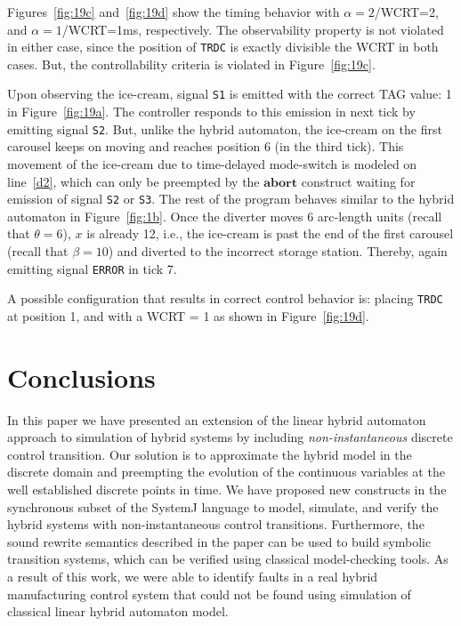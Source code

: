 \documentclass[10pt,journal,cspaper,compsoc]{IEEEtran}
\begin{document}
Figures~\ref{fig:19c} and~\ref{fig:19d} show the timing behavior with
$\alpha = 2$/WCRT=2, and $\alpha=1$/WCRT=1ms, respectively. The
observability property is not violated in either case, since the
position of \texttt{TRDC} is exactly divisible the WCRT in both
cases. But, the controllability criteria is violated in
Figure~\ref{fig:19c}.

Upon observing the ice-cream, signal \texttt{S1} is emitted with the
correct TAG value: 1 in Figure~\ref{fig:19a}. The controller responds to
this emission in next tick by emitting signal \texttt{S2}. But, unlike
the hybrid automaton, the ice-cream on the first carousel keeps on
moving and reaches position 6 (in the third tick). This movement of the
ice-cream due to time-delayed mode-switch is modeled on line~\ref{d2},
which can only be preempted by the $\mathbf{abort}$ construct waiting
for emission of signal \texttt{S2} or \texttt{S3}. The rest of the
program behaves similar to the hybrid automaton in
Figure~\ref{fig:1b}. Once the diverter moves 6 arc-length units (recall
that $\theta = 6$), $x$ is already 12, i.e., the ice-cream is past the
end of the first carousel (recall that $\beta=10$) and diverted to the
incorrect storage station. Thereby, again emitting signal \texttt{ERROR}
in tick 7.

A possible configuration that results in correct control behavior is:
placing \texttt{TRDC} at position 1, and with a WCRT = 1 as shown in
Figure~\ref{fig:19d}.

\section{Conclusions}
\label{sec:conclusions}

In this paper we have presented an extension of the linear hybrid
automaton approach to simulation of hybrid systems by including
\textit{non-instantaneous} discrete control transition. Our solution is
to approximate the hybrid model in the discrete domain and preempting
the evolution of the continuous variables at the well established
discrete points in time. We have proposed new constructs in the
synchronous subset of the SystemJ language to model, simulate, and
verify the hybrid systems with non-instantaneous control
transitions. Furthermore, the sound rewrite semantics described in the
paper can be used to build symbolic transition systems, which can be
verified using classical model-checking tools. As a result of this work,
we were able to identify faults in a real hybrid manufacturing control
system that could not be found using simulation of classical linear
hybrid automaton model.
\end{document}
